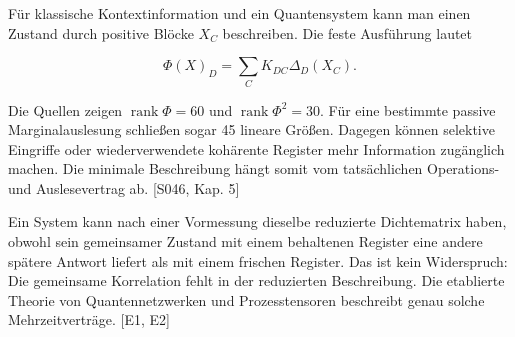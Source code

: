 Für klassische Kontextinformation und ein Quantensystem kann man einen
Zustand durch positive Blöcke \(X_C\) beschreiben. Die feste Ausführung
lautet

\[\Phi(X)_D=\sum_C K_{DC}\Delta_D(X_C).\]

Die Quellen zeigen \(\operatorname{rank}\Phi=60\) und
\(\operatorname{rank}\Phi^2=30\). Für eine bestimmte passive
Marginalauslesung schließen sogar 45 lineare Größen. Dagegen können
selektive Eingriffe oder wiederverwendete kohärente Register mehr
Information zugänglich machen. Die minimale Beschreibung hängt somit vom
tatsächlichen Operations- und Auslesevertrag ab. {[}S046, Kap. 5{]}

Ein System kann nach einer Vormessung dieselbe reduzierte Dichtematrix
haben, obwohl sein gemeinsamer Zustand mit einem behaltenen Register
eine andere spätere Antwort liefert als mit einem frischen Register. Das
ist kein Widerspruch: Die gemeinsame Korrelation fehlt in der
reduzierten Beschreibung. Die etablierte Theorie von Quantennetzwerken
und Prozesstensoren beschreibt genau solche Mehrzeitverträge. {[}E1,
E2{]}

